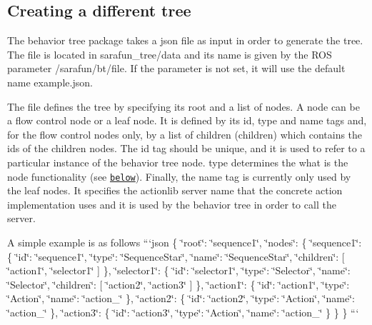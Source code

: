 \subsection*{Creating a different tree }

The behavior tree package takes a json file as input in order to generate the tree. The file is located in {\ttfamily sarafun\-\_\-tree/data} and its name is given by the R\-O\-S parameter {\ttfamily /sarafun/bt/file}. If the parameter is not set, it will use the default name {\ttfamily example.\-json}.

The file defines the tree by specifying its root and a list of nodes. A node can be a flow control node or a leaf node. It is defined by its {\ttfamily id}, {\ttfamily type} and {\ttfamily name} tags and, for the flow control nodes only, by a list of children ({\ttfamily children}) which contains the {\ttfamily id}s of the children nodes. The {\ttfamily id} tag should be unique, and it is used to refer to a particular instance of the behavior tree node. {\ttfamily type} determines the what is the node functionality (see \href{#Currently-supported-node-types}{\tt below}). Finally, the {\ttfamily name} tag is currently only used by the leaf nodes. It specifies the actionlib server name that the concrete action implementation uses and it is used by the behavior tree in order to call the server.

A simple example is as follows ```json \{ \char`\"{}root\char`\"{}\-: \char`\"{}sequence1\char`\"{}, \char`\"{}nodes\char`\"{}\-: \{ \char`\"{}sequence1\char`\"{}\-: \{ \char`\"{}id\char`\"{}\-: \char`\"{}sequence1\char`\"{}, \char`\"{}type\char`\"{}\-: \char`\"{}\-Sequence\-Star\char`\"{}, \char`\"{}name\char`\"{}\-: \char`\"{}\-Sequence\-Star\char`\"{}, \char`\"{}children\char`\"{}\-: \mbox{[} \char`\"{}action1\char`\"{}, \char`\"{}selector1\char`\"{} \mbox{]} \}, \char`\"{}selector1\char`\"{}\-: \{ \char`\"{}id\char`\"{}\-: \char`\"{}selector1\char`\"{}, \char`\"{}type\char`\"{}\-: \char`\"{}\-Selector\char`\"{}, \char`\"{}name\char`\"{}\-: \char`\"{}\-Selector\char`\"{}, \char`\"{}children\char`\"{}\-: \mbox{[} \char`\"{}action2\char`\"{}, \char`\"{}action3\char`\"{} \mbox{]} \}, \char`\"{}action1\char`\"{}\-: \{ \char`\"{}id\char`\"{}\-: \char`\"{}action1\char`\"{}, \char`\"{}type\char`\"{}\-: \char`\"{}\-Action\char`\"{}, \char`\"{}name\char`\"{}\-: \char`\"{}action\-\_\char`\"{} \}, \char`\"{}action2\char`\"{}\-: \{ \char`\"{}id\char`\"{}\-: \char`\"{}action2\char`\"{}, \char`\"{}type\char`\"{}\-: \char`\"{}\-Action\char`\"{}, \char`\"{}name\char`\"{}\-: \char`\"{}action\-\_\char`\"{} \}, \char`\"{}action3\char`\"{}\-: \{ \char`\"{}id\char`\"{}\-: \char`\"{}action3\char`\"{}, \char`\"{}type\char`\"{}\-: \char`\"{}\-Action\char`\"{}, \char`\"{}name\char`\"{}\-: \char`\"{}action\-\_\char`\"{} \} \} \} ```

